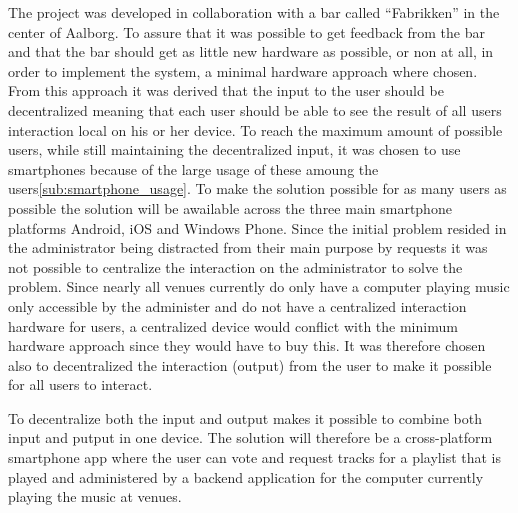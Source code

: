 The project was developed in collaboration with a bar called \enquote{Fabrikken} in the center of Aalborg. To assure that it was possible to get feedback from the bar and that the bar should get as little new hardware as possible, or non at all, in order to implement the system, a minimal hardware approach where chosen.
From this approach it was derived that the input to the user should be decentralized meaning that each user should be able to see the result of all users interaction local on his or her device. To reach the maximum amount of possible users, while still maintaining the decentralized input, it was chosen to use smartphones because of the large usage of these amoung the users\cref{sub:smartphone_usage}. To make the solution possible for as many users as possible the solution will be awailable across the three main smartphone platforms Android, iOS and Windows Phone.
Since the initial problem resided in the administrator being distracted from their main purpose by requests it was not possible to centralize the interaction on the administrator to solve the problem. Since nearly all venues currently do only have a computer playing music only accessible by the administer and do not have a centralized interaction hardware for users, a centralized device would conflict with the minimum hardware approach since they would have to buy this. It was therefore chosen also to decentralized the interaction (output) from the user to make it possible for all users to interact.

To decentralize both the input and output makes it possible to combine both input and putput in one device. The solution will therefore be a cross-platform smartphone app where the user can vote and request tracks for a playlist that is played and administered by a backend application for the computer currently playing the music at venues.